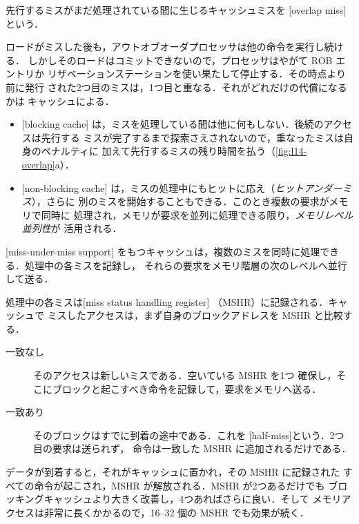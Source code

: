 \documentclass[../main.tex]{subfiles}
\begin{document}
\begin{definition}[オーバーラップミス]
  先行するミスがまだ処理されている間に生じるキャッシュミスを
  [overlap miss]という．
\end{definition}

ロードがミスした後も，アウトオブオーダプロセッサは他の命令を実行し続ける．
しかしそのロードはコミットできないので，プロセッサはやがて ROB エントリか
リザベーションステーションを使い果たして停止する．その時点より前に発行
された2つ目のミスは，1つ目と重なる．それがどれだけの代償になるかは
キャッシュによる．
\begin{itemize}
  \item {}[blocking cache]%
    は，ミスを処理している間は他に何もしない．後続のアクセスは先行する
    ミスが完了するまで探索さえされないので，重なったミスは自身のペナルティに
    加えて先行するミスの残り時間を払う（\cref{fig:l14-overlap}a）．
  \item {}[non-blocking cache]%
    は，ミスの処理中にもヒットに応え（\emph{ヒットアンダーミス}），さらに
    別のミスを開始することもできる．このとき複数の要求がメモリで同時に
    処理され，メモリが要求を並列に処理できる限り，\emph{メモリレベル並列性}が
    活用される．
\end{itemize}

\begin{definition}[ミスアンダーミス対応]
  [miss-under-miss support]%
  をもつキャッシュは，複数のミスを同時に処理できる．処理中の各ミスを記録し，
  それらの要求をメモリ階層の次のレベルへ並行して送る．
\end{definition}

処理中の各ミスは[miss status handling register]%
（MSHR）に記録される．キャッシュで
ミスしたアクセスは，まず自身のブロックアドレスを MSHR と比較する．
\begin{description}
  \item[一致なし] そのアクセスは新しいミスである．空いている MSHR を1つ
    確保し，そこにブロックと起こすべき命令を記録して，要求をメモリへ送る．
  \item[一致あり] そのブロックはすでに到着の途中である．これを
    [half-miss]という．2つ目の要求は送られず，
    命令は一致した MSHR に追加されるだけである．
\end{description}
データが到着すると，それがキャッシュに置かれ，その MSHR に記録された
すべての命令が起こされ，MSHR が解放される．MSHR が2つあるだけでも
ブロッキングキャッシュより大きく改善し，4つあればさらに良い．そして
メモリアクセスは非常に長くかかるので，16--32 個の MSHR でも効果が続く．
\end{document}
